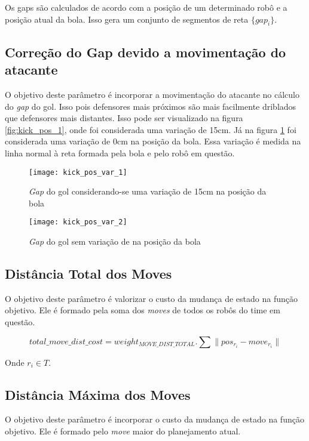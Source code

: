 Os gaps são calculados de acordo com a posição de um determinado robô
e a posição atual da bola. Isso gera um conjunto de segmentos de reta
$\lbrace gap_i \rbrace$.

\subsection{Correção do Gap devido a movimentação do atacante} 
O objetivo deste parâmetro é incorporar a movimentação
do atacante no cálculo do \textit{gap} do gol. Isso pois defensores mais
próximos são mais facilmente driblados que defensores mais distantes. Isso
pode ser visualizado na figura \ref{fig:kick_pos_1}, onde foi considerada
uma variação de 15cm. Já na figura \ref{fig:kick_pos_2} foi considerada uma
variação de 0cm na posição da bola. Essa variação é medida na linha normal
à reta formada pela bola e pelo robô em questão.


\begin{figure}[h]
  \centering
  \texttt{[image: kick\_pos\_var\_1]}
  \caption{\textit{Gap} do gol considerando-se uma variação de 15cm na 
           posição da bola}\label{fig:kick_pos_1}
  \texttt{[image: kick\_pos\_var\_2]}
  \caption{\textit{Gap} do gol sem variação de na posição da
           bola}\label{fig:kick_pos_2}
\end{figure}


\subsection{Distância Total dos Moves} 
O objetivo deste parâmetro é valorizar o custo da
mudança de estado na função objetivo. Ele é formado pela soma dos
\textit{moves} de todos os robôs do time em questão.

\begin{dmath} 
 total{\_}move{\_}dist{\_}cost = weight_{MOVE{\_}DIST{\_}TOTAL} . 
 \sum \lVert pos_{r_i} - move_{r_i}\rVert
\end{dmath} 

Onde $r_i \in T$.

\subsection{Distância Máxima dos Moves} 
O objetivo deste parâmetro é incorporar o custo da
mudança de estado na função objetivo. Ele é formado pelo \textit{move}
maior do planejamento atual.

